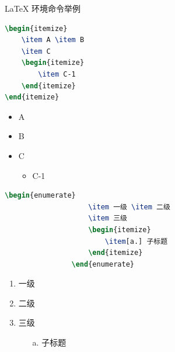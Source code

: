 \documentclass{beamer}
\begin{document}
	\begin{frame}[fragile]{\LaTeX{} 环境命令举例}
		\begin{minipage}{0.5\linewidth}
			\begin{lstlisting}[language=TeX]
\begin{itemize}
    \item A \item B
    \item C
    \begin{itemize}
        \item C-1
    \end{itemize}
\end{itemize}
\end{lstlisting}
		\end{minipage}\hspace{1cm}
		\begin{minipage}{0.3\linewidth}
			\begin{itemize}
				\item A
				\item B
				\item C
				\begin{itemize}
					\item C-1
				\end{itemize}
			\end{itemize}
		\end{minipage}
		\medskip
		\pause
		\begin{minipage}{0.5\linewidth}
			\begin{lstlisting}[language=TeX]
				\begin{enumerate}
					\item 一级 \item 二级
					\item 三级
					\begin{itemize}
						\item[a.] 子标题
					\end{itemize}
				\end{enumerate}
			\end{lstlisting}
		\end{minipage}\hspace{1cm}
		\begin{minipage}{0.3\linewidth}
			\begin{enumerate}
				\item 一级
				\item 二级
				\item 三级
				\begin{itemize}
					\item[a.] 子标题
				\end{itemize}
			\end{enumerate}
		\end{minipage}
	\end{frame}
\end{document}
